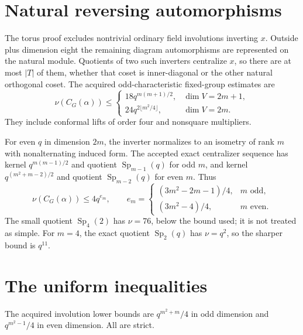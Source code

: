 \documentclass[11pt,a4paper]{article}
\newcommand{\Sp}{\operatorname{Sp}}\newcommand{\Aut}{\operatorname{Aut}}
\begin{document}
\section{Natural reversing automorphisms}
The torus proof excludes nontrivial ordinary field involutions inverting
$x$. Outside plus dimension eight the remaining diagram automorphisms
are represented on the natural module. Quotients of two such inverters
centralize $x$, so there are at most $|T|$ of them, whether that coset
is inner-diagonal or the other natural orthogonal coset.
The acquired odd-characteristic fixed-group estimates are
\begin{equation}\label{oddfixed}
 \nu(C_G(\alpha))\le
 \begin{cases}
 18q^{m(m+1)/2},&\dim V=2m+1,\\
 24q^{2\lfloor m^2/4\rfloor},&\dim V=2m.
 \end{cases}
\end{equation}
They include conformal lifts of order four and nonsquare multipliers.

For even $q$ in dimension $2m$, the inverter normalizes to an isometry
of rank $m$ with nonalternating induced form. The accepted exact
centralizer sequence has kernel $q^{m(m-1)/2}$ and quotient
$\Sp_{m-1}(q)$ for odd $m$, and kernel $q^{(m^2+m-2)/2}$ and
quotient $\Sp_{m-2}(q)$ for even $m$. Thus
\begin{equation}\label{evenfixed}
 \nu(C_G(\alpha))\le4q^{e_m},\qquad
 e_m=\begin{cases}(3m^2-2m-1)/4,&m\text{ odd},\\
                  (3m^2-4)/4,&m\text{ even}.
       \end{cases}
\end{equation}
The small quotient $\Sp_4(2)$ has $\nu=76$, below the bound used;
it is not treated as simple. For $m=4$, the exact quotient
$\Sp_2(q)$ has $\nu=q^2$, so the sharper bound is $q^{11}$.

\section{The uniform inequalities}
The acquired involution lower bounds are $q^{m^2+m}/4$ in odd
dimension and $q^{m^2-1}/4$ in even dimension. All are strict.
\end{document}
